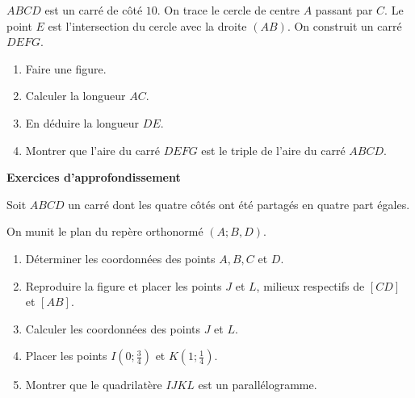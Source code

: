 \documentclass[11pt]{article}
\begin{document}
\begin{exo}
$ABCD$ est un carré de côté $10$. On trace le cercle de
centre $A$ passant par $C$. Le point $E$ est l'intersection du cercle avec la
droite $(AB)$. On construit un carré $DEFG$.
\begin{enumerate}
  \item Faire une figure.
  \item Calculer la longueur $AC$.
  \item En déduire la longueur $DE$.
  \item Montrer que l'aire du carré $DEFG$ est le triple de l'aire du carré
    $ABCD$.
\end{enumerate}
\end{exo}

\begin{center}
  \LARGE
  \textbf{Exercices d'approfondissement}
\end{center}

\begin{exo}
Soit $ABCD$ un carré dont les quatre côtés ont été
partagés en quatre part égales.
\begin{minipage}{.7\textwidth}
On munit le plan du repère orthonormé $(A; B, D)$.
\begin{enumerate}
  \item Déterminer les coordonnées des points $A, B, C$ et $D$.
  \item Reproduire la figure et placer les points $J$ et $L$, milieux respectifs
    de $\left[ CD \right]$ et $\left[ AB \right]$.
  \item Calculer les coordonnées des points $J$ et $L$.
  \item Placer les points $I(0; \frac{3}{4})$ et $K(1; \frac{1}{4})$.
  \item Montrer que le quadrilatère $IJKL$ est un parallélogramme.
\end{enumerate}
\end{minipage}
\begin{minipage}{.3\textwidth}
  \begin{center}
  \end{center}
\end{minipage}
\end{exo}
\end{document}
